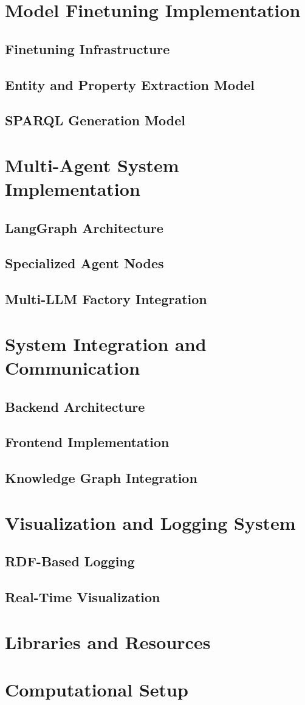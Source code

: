 \section{Model Finetuning Implementation}
\subsection{Finetuning Infrastructure}
\subsection{Entity and Property Extraction Model}
\subsection{SPARQL Generation Model}

\section{Multi-Agent System Implementation}
\subsection{LangGraph Architecture}
\subsection{Specialized Agent Nodes}
\subsection{Multi-LLM Factory Integration}

\section{System Integration and Communication}
\subsection{Backend Architecture}
\subsection{Frontend Implementation}
\subsection{Knowledge Graph Integration}

\section{Visualization and Logging System}
\subsection{RDF-Based Logging}
\subsection{Real-Time Visualization}

\section{Libraries and Resources}

\section{Computational Setup}